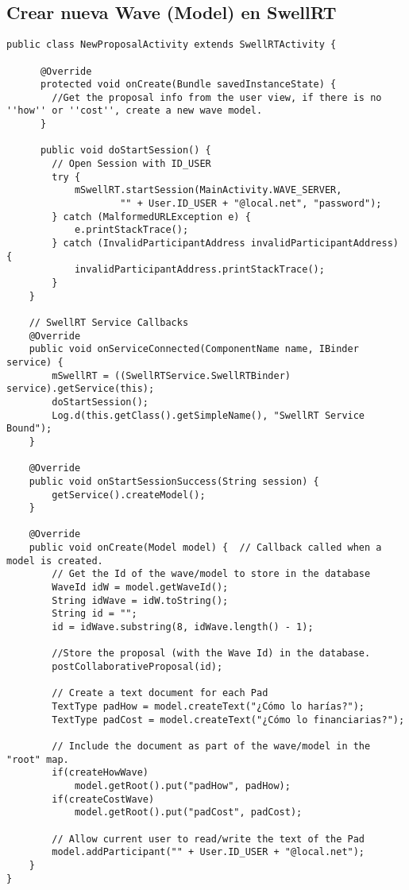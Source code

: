 \subsection{Crear nueva Wave (Model) en SwellRT} \label{ssec:waveCreateModel}

	  \begin{lstlisting}[frame=single]  
public class NewProposalActivity extends SwellRTActivity {
	  
	  @Override
	  protected void onCreate(Bundle savedInstanceState) {
	  	//Get the proposal info from the user view, if there is no ''how'' or ''cost'', create a new wave model.
	  }
	  
	  public void doStartSession() {
        // Open Session with ID_USER
        try {
            mSwellRT.startSession(MainActivity.WAVE_SERVER,
                    "" + User.ID_USER + "@local.net", "password");
        } catch (MalformedURLException e) {
            e.printStackTrace();
        } catch (InvalidParticipantAddress invalidParticipantAddress) {
            invalidParticipantAddress.printStackTrace();
        }
    }

    // SwellRT Service Callbacks
    @Override
    public void onServiceConnected(ComponentName name, IBinder service) {
        mSwellRT = ((SwellRTService.SwellRTBinder) service).getService(this);
        doStartSession();
        Log.d(this.getClass().getSimpleName(), "SwellRT Service Bound");
    }
    
    @Override
    public void onStartSessionSuccess(String session) {		
		getService().createModel();
    }
   
    @Override
    public void onCreate(Model model) {  // Callback called when a model is created.      
        // Get the Id of the wave/model to store in the database
        WaveId idW = model.getWaveId();
        String idWave = idW.toString();
        String id = "";
        id = idWave.substring(8, idWave.length() - 1);

        //Store the proposal (with the Wave Id) in the database.
        postCollaborativeProposal(id);

        // Create a text document for each Pad
        TextType padHow = model.createText("¿Cómo lo harías?");
        TextType padCost = model.createText("¿Cómo lo financiarias?");

        // Include the document as part of the wave/model in the "root" map.
        if(createHowWave)
            model.getRoot().put("padHow", padHow);
        if(createCostWave)
            model.getRoot().put("padCost", padCost);

        // Allow current user to read/write the text of the Pad
        model.addParticipant("" + User.ID_USER + "@local.net");
    }  	
}	  
	  \end{lstlisting}
	  

